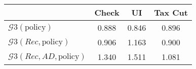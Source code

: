 \begin{tabular}{@{}lccc@{}} 
\toprule 
                          & Check      & UI    & Tax Cut    \\  \midrule 
$\mathcal{G}3(\text{policy})$ & 0.888  & 0.846  & 0.896     \\ 
$\mathcal{G}3(Rec,\text{policy})$ & 0.906  & 1.163  & 0.900     \\ 
$\mathcal{G}3(Rec, AD,\text{policy})$ & 1.340  & 1.511  & 1.081     \\ 
\end{tabular}  
